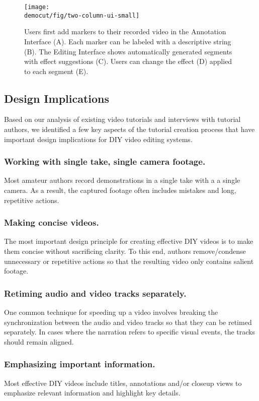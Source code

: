 \begin{figure*}[t]
  \centering
  \texttt{[image: \\democut/fig/two-column-ui-small]}
  \caption{Users first add markers to their recorded video in the Annotation Interface (A). Each marker can be labeled with a descriptive string (B). The Editing Interface shows automatically generated segments with effect suggestions (C). Users can change the effect (D) applied to each segment (E).}
  \label{fig:ui}
    \vspace{-0.15in}
\end{figure*}


\subsection{Design Implications}

Based on our analysis of existing video tutorials and interviews with
tutorial authors, we identified a few key aspects of the tutorial creation
process that have important design implications for DIY video
editing systems.

\subsubsection{Working with single take, single camera footage.}
%
Most amateur authors record demonstrations in a single take with a
a single camera. As a result, the captured footage often includes
mistakes and long, repetitive actions.

\subsubsection{Making concise videos.}
%
The most important design principle for creating effective DIY videos
is to make them concise without sacrificing clarity. To this end,
authors remove/condense unnecessary or repetitive actions so that the
resulting video only contains salient footage.

\subsubsection{Retiming audio and video tracks separately.}
%
One common technique for speeding up a video involves breaking the
synchronization between the audio and video tracks so that they can be retimed
separately. In cases where the narration refers to
specific visual events, the tracks should remain aligned.

\subsubsection{Emphasizing important information.}
%
Most effective DIY videos include titles, annotations and/or closeup
views to emphasize relevant information and highlight key details.

